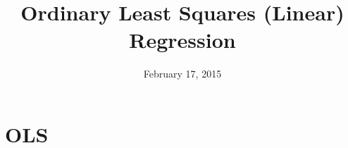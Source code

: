 
\usepackage{tikz}
\usetikzlibrary{shapes,arrows}

\title{Ordinary Least Squares (Linear) Regression}

\date[]{February 17, 2015}



\frame{\titlepage}

\frame{\tableofcontents}


\section{OLS}




\appendix
\frame{}



